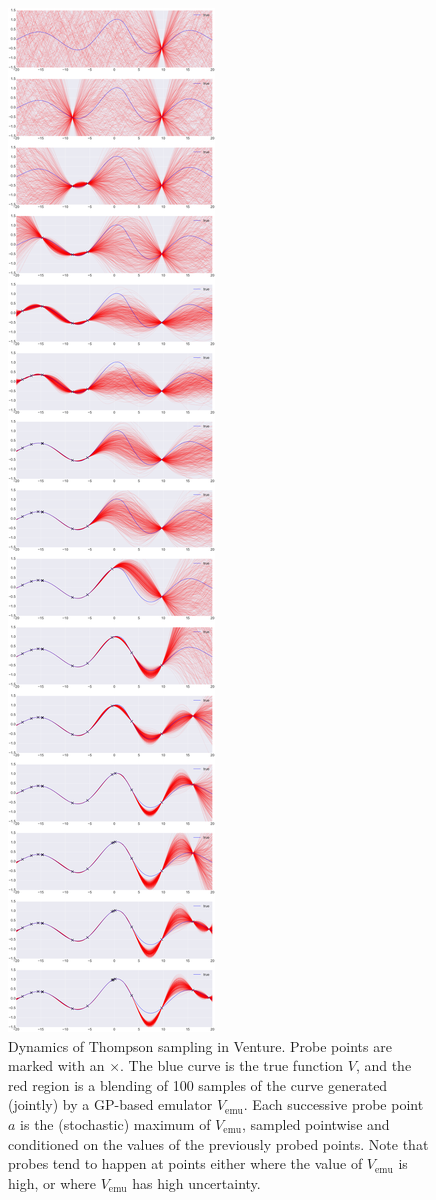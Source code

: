 \documentclass{article} %
\newcommand{\emu}{{\textrm{emu}}}
\begin{document}
\begin{figure}
\centering
    \includegraphics[height=0.8\textheight]{figs/BayesOpt_gpmem_sequence_small.png}
    \caption{
      Dynamics of Thompson sampling in Venture.
      Probe points are marked with an $\times$.
      The blue curve is the true function $V$, and the red region is a blending of 100 samples of the curve generated (jointly) by a GP-based emulator $V_\emu$.
      Each successive probe point $a$ is the (stochastic) maximum of $V_\emu$, sampled pointwise and conditioned on the values of the previously probed points.
      Note that probes tend to happen at points either where the value of $V_\emu$ is high, or where $V_\emu$ has high uncertainty.
      }
    \label{fig:bayesopt-sequence}
\end{figure}
\end{document}
